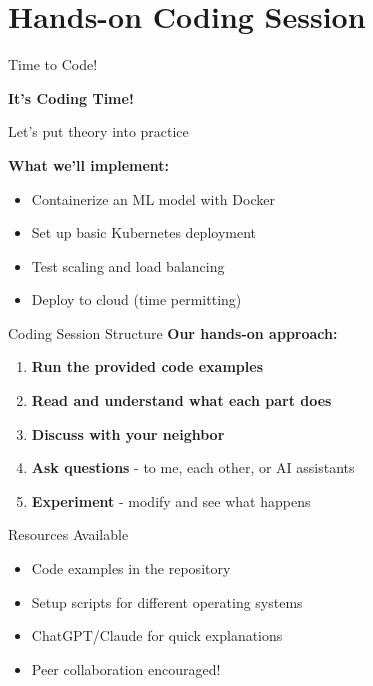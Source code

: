 \documentclass[../main.tex]{subfiles}
\begin{document}
\section{Hands-on Coding Session}

\begin{frame}{Time to Code!}
    \begin{center}
        \Huge{\textbf{It's Coding Time!}}

        \bigskip
        \bigskip

        \Large{Let's put theory into practice}
    \end{center}

    \bigskip

    \textbf{What we'll implement:}
    \begin{itemize}
        \item Containerize an ML model with Docker
        \item Set up basic Kubernetes deployment
        \item Test scaling and load balancing
        \item Deploy to cloud (time permitting)
    \end{itemize}
\end{frame}

\begin{frame}{Coding Session Structure}
    \textbf{Our hands-on approach:}

    \begin{enumerate}
        \item \textbf{Run the provided code examples}
        \item \textbf{Read and understand what each part does}
        \item \textbf{Discuss with your neighbor}
        \item \textbf{Ask questions} - to me, each other, or AI assistants
        \item \textbf{Experiment} - modify and see what happens
    \end{enumerate}

    \bigskip

    \begin{alertblock}{Resources Available}
        \begin{itemize}
            \item Code examples in the repository
            \item Setup scripts for different operating systems
            \item ChatGPT/Claude for quick explanations
            \item Peer collaboration encouraged!
        \end{itemize}
    \end{alertblock}
\end{frame}
\end{document}
